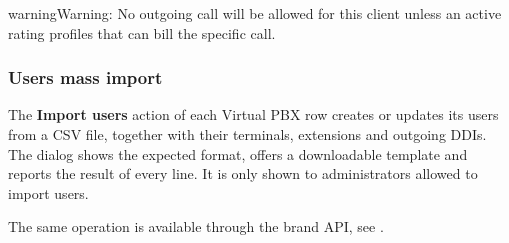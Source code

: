 \documentclass[letterpaper,10pt,english]{sphinxmanual}
\begin{document}
\begin{notice}{warning}{Warning:}
No outgoing call will be allowed for this client unless an active rating profiles that can
bill the specific call.
\end{notice}


\subsubsection{Users mass import}
\label{administration_portal/brand/clients/virtual_pbx:id2}\label{administration_portal/brand/clients/virtual_pbx:users-mass-import}
The \textbf{Import users} action of each Virtual PBX row creates or updates its users from a
CSV file, together with their terminals, extensions and outgoing DDIs. The dialog
shows the expected format, offers a downloadable template and reports the result
of every line. It is only shown to administrators allowed to import users.

The same operation is available through the brand API, see {\hyperref[administration_portal/brand/clients/virtual_pbx:users\string-mass\string-import\string-api]{}}.
\end{document}
